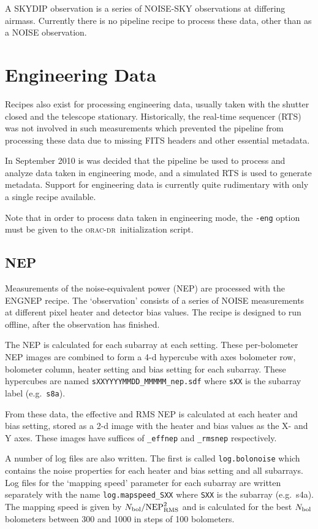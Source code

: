 \documentclass[twoside,11pt]{article}
\newcommand{\xlabel}[1]{}
\renewcommand{\_}{\texttt{\symbol{95}}}
\newcommand{\oracdr}{\textsc{orac-dr}}
\newcommand{\task}[1]{\textsf{#1}}
\begin{document}
A SKYDIP observation is a series of NOISE-SKY observations at
differing airmass. Currently there is no pipeline recipe to process
these data, other than as a NOISE observation.


\section{\xlabel{engineering}Engineering Data\label{se:eng}}

Recipes also exist for processing engineering data, usually taken with
the shutter closed and the telescope stationary. Historically, the
real-time sequencer (RTS) was not involved in such measurements which
prevented the pipeline from processing these data due to missing FITS
headers and other essential metadata.

In September 2010 is was decided that the pipeline be used to process
and analyze data taken in engineering mode, and a simulated RTS is
used to generate metadata. Support for engineering data is currently
quite rudimentary with only a single recipe available.

Note that in order to process data taken in engineering mode, the
\verb+-eng+ option must be given to the \oracdr\ initialization
script.

\subsection{NEP}

Measurements of the noise-equivalent power (NEP) are processed with
the \task{ENG\_NEP} recipe. The `observation' consists of a series of
NOISE measurements at different pixel heater and detector bias
values. The recipe is designed to run offline, after the observation
has finished.

The NEP is calculated for each subarray at each setting. These
per-bolometer NEP images are combined to form a 4-d hypercube with
axes bolometer row, bolometer column, heater setting and bias setting
for each subarray. These hypercubes are named
\verb+sXXYYYYMMDD_MMMMM_nep.sdf+ where \verb+sXX+ is the subarray
label (e.g.\ \verb+s8a+).

From these data, the effective and RMS NEP is calculated at each
heater and bias setting, stored as a 2-d image with the heater and
bias values as the X- and Y axes. These images have suffices of
\verb+_effnep+ and \verb+_rmsnep+ respectively.

A number of log files are also written. The first is called
\verb+log.bolonoise+ which contains the noise properties for each
heater and bias setting and all subarrays. Log files for the `mapping
speed' parameter for each subarray are written separately with the
name \verb+log.mapspeed_SXX+ where \verb+SXX+ is the subarray
(e.g.\ s4a). The mapping speed is given by $N_{\rm bol} / {\rm
  NEP}_{\rm RMS}^2$ and is calculated for the best $N_{\rm bol}$
bolometers between 300 and 1000 in steps of 100 bolometers.
\end{document}

